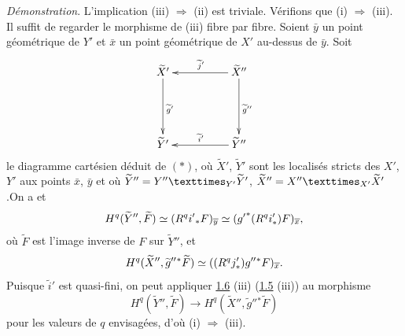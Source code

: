 \documentclass[10pt]{../fichiers-configuration-latex/smfart}
\begin{document}
\noindent
\emph{Démonstration}. L'implication (iii) $\Rightarrow$ (ii) est
triviale. Vérifions que (i) $\Rightarrow$ (iii). Il suffit de regarder
le morphisme de (iii) fibre par fibre. Soient $\bar{y}$ un point
géométrique de $Y'$ et $\bar{x}$ un point géométrique de $X'$
au-dessus de $\bar{y}$. Soit
$$
\xymatrix@=1.75cm{
\widetilde{X}'   \ar[d]^{\widetilde{g}'}& \widetilde{X}''
\ar[l]_{\widetilde{j}'} \ar[d]^{\widetilde{g}''}\\
 \widetilde{Y}'           & \widetilde{Y}'' \ar[l]_{\widetilde{i}'}
}
$$
le diagramme cartésien déduit de $({\ast})$, où $\widetilde{X}'$,
$\widetilde{Y}'$ sont les localisés stricts des $X'$, $Y'$ aux points
$\bar{x}$, $\bar{y}$ et où
$\widetilde{Y}''=\fprod{Y''}{\widetilde{Y}'}{Y'}$,
$\widetilde{X}''=\fprod{X''}{\widetilde{X}'}{X'}$.\pageoriginale On a
 et 
$$
H^{q}(\widetilde{Y}'',\widetilde{F})\simeq
(R^{q}i'{}_{\ast}F)_{\overline{y}}\simeq
({g'}^{\ast}(R^{q}i'_{\ast})F)_{\overline{x}}{},
$$
où $\widetilde{F}$ est l'image inverse de $F$ sur $\widetilde{Y}''$,
et
$$
H^{q}(\widetilde{X}'',{\widetilde{g}''}{}^{\ast}\widetilde{F})\simeq
((R^{q}j'_{\ast}){g''}{}^{\ast}F)_{\overline{x}}{}.
$$
Puisque $\widetilde{i}'$ est quasi-fini, on peut appliquer \hyperref[XV.prop1.6]{1.6} (iii)
(\resp \hyperref[XV.cor1.5]{1.5} (iii)) au morphisme
$$
H^{q}(\widetilde{Y}'',\widetilde{F})\longrightarrow
H^{q}(\widetilde{X}'',{\widetilde{g}''}{}^{\ast}\widetilde{F})
$$
pour les valeurs de $q$ envisagées, d'où (i) $\Rightarrow$ (iii).
\end{document}
